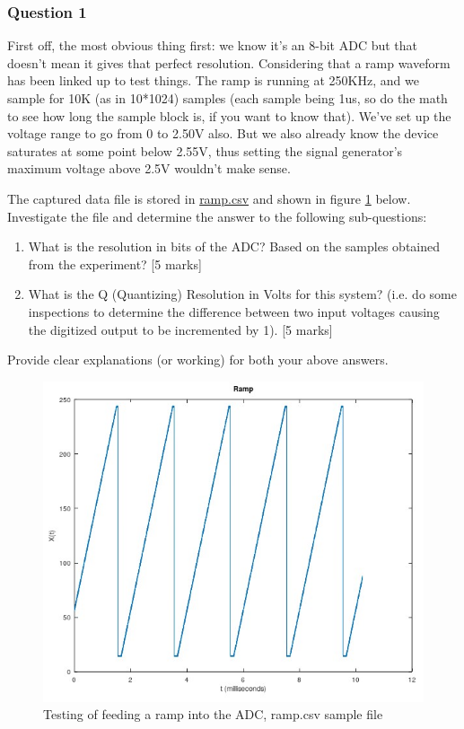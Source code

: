 \subsubsection{Question 1}

First off, the most obvious thing first: we know it’s an 8-bit ADC but that doesn’t mean it gives that perfect resolution. Considering that a ramp waveform has been linked up to test things. The ramp is running at 250KHz, and we sample for 10K (as in 10*1024) samples (each sample being 1us, so do the math to see how long the sample block is, if you want to know that).
We’ve set up the voltage range to go from 0 to 2.50V also. But we also already know the device saturates at some point below 2.55V, thus setting the signal generator’s maximum voltage above 2.5V wouldn't make sense.

The captured data file is stored in \href{http://ocw.ee.uct.ac.za/courses/EEE3096S/miscres/adcmet1/ramp.csv}{ramp.csv} and shown in figure \ref{fig:ramp} below. Investigate the file and determine the answer to the following sub-questions:

\begin{enumerate}
\item What is the resolution in bits of the ADC? Based on the samples obtained from the experiment? [5 marks]
\item What is the Q (Quantizing) Resolution in Volts for this system?  (i.e. do some inspections to determine the difference between two input voltages causing the digitized output to be incremented by 1). [5 marks]
\end{enumerate}

Provide clear explanations (or working) for both your above answers.

\begin{figure}[H]
\centering
\includegraphics[width=0.8\columnwidth]{Body/ADC_Voltmeter/images/eee_adcmet_pr01_ramp.jpg}
\caption{Testing of feeding a ramp into the ADC, ramp.csv sample file}
\label{fig:ramp}
\end{figure}

